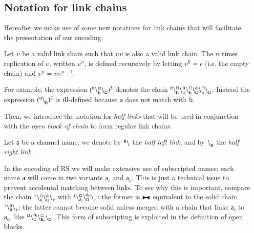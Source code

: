 \subsection{Notation for link chains}

Hereafter we make use of some new notations for link chains that will facilitate  
the presentation of our 
encoding.

\begin{definition}[Replication]
Let $\upsilon$ be a valid link chain such that $\upsilon\upsilon$ is also a valid link chain. The $n$ times replication of $\upsilon$, written $\upsilon^n$, is defined recursively by letting
$\upsilon^0 = \epsilon$ (i.e. the empty chain) and $\upsilon^n = \upsilon\upsilon^{n-1}$.
\end{definition}

For example,  the expression $({}^{\mathsf{a}}_{}\backslash_{\mathsf{b}}^{\scriptstyle {\square}}\backslash_{\scriptstyle {\square}}^{})^3$  denotes the chain ${}^{\mathsf{a}}_{}\backslash_{\mathsf{b}}^{\scriptstyle {\square}}\backslash_{\scriptstyle {\square}}^{\mathsf{a}}\backslash_{\mathsf{b}}^{\scriptstyle {\square}}\backslash_{\scriptstyle {\square}}^{\mathsf{a}}\backslash_{\mathsf{b}}^{\scriptstyle {\square}}\backslash_{\scriptstyle {\square}}^{}$. 
Instead the expression $({}^{\mathsf{a}} \backslash_{\mathsf{b}}^{})^2$ is ill-defined because $\mathsf{a}$ does not match with $\mathsf{b}$.

Then, we introduce the notation for \emph{half links} that will be used in conjunction with the \emph{open block of chain} to form regular link chains.

\begin{definition}
Let $\mathsf{a}$ be a channel name, we denote by ${}^{\mathsf{a}} \backslash_{}^{}$ the \emph{half left link},  and by ${}^{} \backslash_{\mathsf{a}}^{}$ the  \emph{half right link}.
\end{definition}

In the encoding of RS we will make extensive use of subscripted names:  each name $\mathsf{a}$ will come in two variants $\mathsf{a}_i$ and $\mathsf{a}_o$. This is just a technical issue to prevent accidental matching between links. To see why this is important, compare the chain 
${}^{\tau}_{}\backslash_{\mathsf{a}}^{\scriptstyle {\square}}\backslash_{\scriptstyle {\square}}^{\mathsf{a}}\backslash_{\tau}^{}$ with 
${}^{\tau}_{}\backslash_{\mathsf{a}_i}^{\scriptstyle {\square}}\backslash_{\scriptstyle {\square}}^{\mathsf{a}_o}\backslash_{\tau}^{}$: the former is $\blackstretcheq$ equivalent to the solid chain ${}^{\tau}_{}\backslash_{\mathsf{a}}^{\mathsf{a}}\backslash_{\tau}^{}$; the latter cannot become solid unless merged with a chain that links $\mathsf{a}_i$ to $\mathsf{a}_o$, like 
${}^{\scriptstyle {\square}}_{}\backslash_{\scriptstyle {\square}}^{\mathsf{a}_i}\backslash_{\mathsf{a}_o}^{\scriptstyle {\square}}\backslash_{\scriptstyle {\square}}^{}$.
This form of subscripting is exploited in the definition of open blocks.

